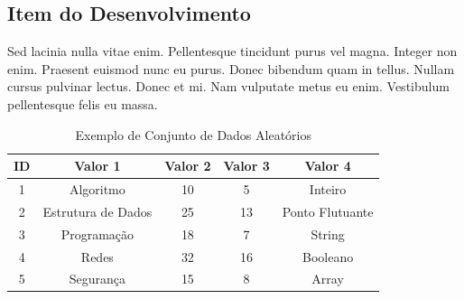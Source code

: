 \subsection{Item do Desenvolvimento}

Sed lacinia nulla vitae enim. Pellentesque tincidunt purus vel magna.
Integer non enim. Praesent euismod nunc eu purus. Donec bibendum quam in tellus.
Nullam cursus pulvinar lectus. Donec et mi. Nam vulputate metus eu enim. Vestibulum
pellentesque felis eu massa. \\

\begin{table}[htbp]
    \centering
    \caption{Exemplo de Conjunto de Dados Aleatórios}
    \begin{tabular}{c c c c c}
    \toprule
    \textbf{ID} & \textbf{Valor 1} & \textbf{Valor 2} & \textbf{Valor 3} & \textbf{Valor 4} \\
    \midrule
    1 & Algoritmo & 10 & 5 & Inteiro \\
    2 & Estrutura de Dados & 25 & 13 & Ponto Flutuante \\
    3 & Programação & 18 & 7 & String \\
    4 & Redes & 32 & 16 & Booleano \\
    5 & Segurança & 15 & 8 & Array \\
    \bottomrule
    \end{tabular}
\end{table}